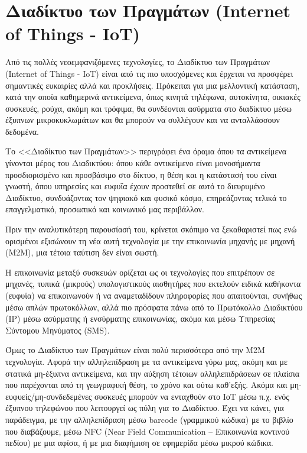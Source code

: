 \documentclass[12pt, a4paper, oneside]{report}
\begin{document}
\chapter{Διαδίκτυο των Πραγμάτων (Internet of Things - IoT)}

Από τις πολλές νεοεμφανιζόμενες τεχνολογίες, το Διαδίκτυο των Πραγμάτων (Internet of Things - IoT) είναι από τις πιο υποσχόμενες και έρχεται να προσφέρει σημαντικές ευκαιρίες αλλά και προκλήσεις. Πρόκειται για μια μελλοντική κατάσταση, κατά την οποία καθημερινά αντικείμενα, όπως κινητά τηλέφωνα, αυτοκίνητα, οικιακές συσκευές, ρούχα, ακόμη και τρόφιμα, θα συνδέονται ασύρματα στο διαδίκτυο μέσω έξυπνων μικροκυκλωμάτων και θα μπορούν να συλλέγουν και να ανταλλάσσουν δεδομένα.

Το <<Διαδίκτυο των Πραγμάτων>> περιγράφει ένα όραμα όπου τα αντικείμενα γίνονται μέρος του Διαδικτύου: όπου κάθε αντικείμενο είναι μονοσήμαντα προσδιορισμένο και προσβάσιμο στο δίκτυο, η θέση και η κατάστασή του είναι γνωστή, όπου υπηρεσίες και ευφυΐα έχουν προστεθεί σε αυτό το διευρυμένο Διαδίκτυο, συνδυάζοντας τον ψηφιακό και φυσικό κόσμο, επηρεάζοντας τελικά το επαγγελματικό, προσωπικό και κοινωνικό μας περιβάλλον.

Πριν την αναλυτικότερη παρουσίασή του, κρίνεται σκόπιμο να ξεκαθαριστεί πως ενώ ορισμένοι εξισώνουν τη νέα αυτή τεχνολογία με την επικοινωνία μηχανής με μηχανή (Μ2Μ), μια τέτοια ταύτιση δεν είναι σωστή.

Η επικοινωνία μεταξύ συσκευών ορίζεται ως οι τεχνολογίες που επιτρέπουν σε μηχανές, τυπικά (μικρούς) υπολογιστικούς αισθητήρες που εκτελούν ειδικά καθήκοντα (ευφυΐα) να επικοινωνούν ή να αναμεταδίδουν πληροφορίες που απαιτούνται, συνήθως μέσω απλών πρωτοκόλλων, αλλά πιο πρόσφατα πάνω από το Πρωτόκολλο Διαδικτύου (ΙΡ) μέσω ασύρματης ή ενσύρματης επικοινωνίας, ακόμα και μέσω Υπηρεσίας Σύντομου Μηνύματος (SMS).

Όμως το Διαδίκτυο των Πραγμάτων είναι πολύ περισσότερα από την Μ2Μ τεχνολογία. Αφορά την αλληλεπίδραση με τα αντικείμενα γύρω μας, ακόμη και με στατικά μη-έξυπνα αντικείμενα, και την αύξηση τέτοιων αλληλεπιδράσεων σε πλαίσια που παρέχονται από τη γεωγραφική θέση, το χρόνο και ούτω καθ'εξής. Ακόμα και μη-ευφυείς\slash μη-συνδεδεμένες συσκευές μπορούν να ενταχθούν στο ΙοΤ μέσω π.χ. ενός έξυπνου τηλεφώνου που λειτουργεί ως πύλη για το Διαδίκτυο. Έχει να κάνει, για παράδειγμα, με την αλληλεπίδραση μέσω barcode (γραμμικού κώδικα) με το βιβλίο που διαβάζουμε, μέσω NFC (Near Field Communication – Επικοινωνία κοντινού πεδίου) με μια αφίσα, ή με μια διαφήμιση σε εφημερίδα μέσω μικρού κώδικα.
\end{document}
